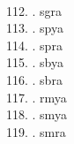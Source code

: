 \begin{tabbing}
\egroup  \\
112.	. 	\> sgra 	\> \bgroup\tibetan \def\u#1{\vtop{\baselineskip0pt\hbox{#1}\hbox{\tibsp\char123}}}\parindent=0pt \newbox\fillerbox\setbox\fillerbox\hbox{\vrule height0.4cm depth0.4cm width0pt}\def\filler{\copy\fillerbox}\filler\tibsp{}\tenrm\ \tibetan
\egroup  \\
113.	. 	\> spya 	\> \bgroup\tibetan \def\u#1{\vtop{\baselineskip0pt\hbox{#1}\hbox{\tibsp\char123}}}\parindent=0pt \newbox\fillerbox\setbox\fillerbox\hbox{\vrule height0.4cm depth0.4cm width0pt}\def\filler{\copy\fillerbox}\filler\tibsp{}\tenrm\ \tibetan
\egroup  \\
114.	. 	\> spra 	\> \bgroup\tibetan \def\u#1{\vtop{\baselineskip0pt\hbox{#1}\hbox{\tibsp\char123}}}\parindent=0pt \newbox\fillerbox\setbox\fillerbox\hbox{\vrule height0.4cm depth0.4cm width0pt}\def\filler{\copy\fillerbox}\filler\tibsp{}\tenrm\ \tibetan
\egroup  \\
115.	. 	\> sbya 	\> \bgroup\tibetan \def\u#1{\vtop{\baselineskip0pt\hbox{#1}\hbox{\tibsp\char123}}}\parindent=0pt \newbox\fillerbox\setbox\fillerbox\hbox{\vrule height0.4cm depth0.4cm width0pt}\def\filler{\copy\fillerbox}\filler\tibsp{}\tenrm\ \tibetan
\egroup  \\
116.    .  \> sbra		\> \bgroup\tibetan \def\u#1{\vtop{\baselineskip0pt\hbox{#1}\hbox{\tibsp\char123}}}\parindent=0pt \newbox\fillerbox\setbox\fillerbox\hbox{\vrule height0.4cm depth0.4cm width0pt}\def\filler{\copy\fillerbox}\filler\tibsp{}\tenrm\ \tibetan
\egroup  \\ 
117.	. 	\> rmya 	\> \bgroup\tibetan \def\u#1{\vtop{\baselineskip0pt\hbox{#1}\hbox{\tibsp\char123}}}\parindent=0pt \newbox\fillerbox\setbox\fillerbox\hbox{\vrule height0.4cm depth0.4cm width0pt}\def\filler{\copy\fillerbox}\filler\tibsp{}\tenrm\ \tibetan
\egroup  \\
118.	. 	\> smya 	\> \bgroup\tibetan \def\u#1{\vtop{\baselineskip0pt\hbox{#1}\hbox{\tibsp\char123}}}\parindent=0pt \newbox\fillerbox\setbox\fillerbox\hbox{\vrule height0.4cm depth0.4cm width0pt}\def\filler{\copy\fillerbox}\filler\tibsp{}\tenrm\ \tibetan
\egroup  \\
119.	. 	\> smra 	\> \bgroup\tibetan \def\u#1{\vtop{\baselineskip0pt\hbox{#1}\hbox{\tibsp\char123}}}\parindent=0pt \newbox\fillerbox\setbox\fillerbox\hbox{\vrule height0.4cm depth0.4cm width0pt}\def\filler{\copy\fillerbox}\filler\tibsp{}\tenrm\ \tibetan

\end{tabbing}
